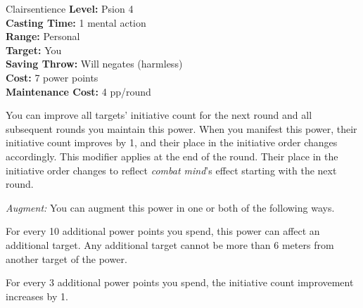 {Clairsentience}
{
	\textbf{Level:}
	Psion 4\\
	\textbf{Casting Time:}
	1 mental action\\
	\textbf{Range:}
	Personal\\
	\textbf{Target:}
	You\\
	\textbf{Saving Throw:}
	Will negates (harmless)\\
	\textbf{Cost:}
	7 power points\\
	\textbf{Maintenance Cost:}
	4 pp/round\\
}
{
	You can improve all targets' initiative count for the next round and all subsequent rounds you maintain this power. When you manifest this power, their initiative count improves by 1, and their place in the initiative order changes accordingly. This modifier applies at the end of the round. Their place in the initiative order changes to reflect \emph{combat mind}'s effect starting with the next round.

	\textit{Augment:} You can augment this power in one or both of the following ways.
	\begin{enumerate*}
		\item For every 10 additional power points you spend, this power can affect an additional target. Any additional target cannot be more than 6 meters from another target of the power.
		\item For every 3 additional power points you spend, the initiative count improvement increases by 1.
	\end{enumerate*}
}